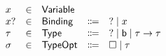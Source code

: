 \documentclass[acmsmall,dvipsnames,10pt,nonacm]{acmart}\settopmatter{printfolios=true} %
\newcommand{\TName}{{\normalfont\textsf{Type}}}
\newcommand{\TV}{\ensuremath{\tau}}
\newcommand{\THole}{\ensuremath{?}}
\newcommand{\TBase}{\ensuremath{{\normalfont\textsf{b}}}} %
\newcommand{\TNum}{\ensuremath{{\normalfont\textsf{num}}}}
\newcommand{\TArrow}[2]{\ensuremath{#1 \to #2}}
\newcommand{\DName}{{\normalfont\textsf{TypeOpt}}}
\newcommand{\DV}{\ensuremath{\sigma}}
\newcommand{\DNone}{\square}
\newcommand{\DSome}[1]{#1}
\newcommand{\MName}{{\normalfont\textsf{Mark}}}
\newcommand{\MV}{\ensuremath{m}}
\newcommand{\MGood}{\ensuremath{\scalebox{0.7}{{\color{mygreen} \checkmark}}}}
\newcommand{\MBad}{\ensuremath{{\color{myred}\times}}}
\newcommand{\BEName}{{\normalfont\textsf{BareExp}}}
\newcommand{\BEV}{\ensuremath{e}}
\newcommand{\MEUName}{{\normalfont\textsf{MarkedSynExp}}}
\newcommand{\MEUV}{\ensuremath{\check{e}^{\Syn}}}
\newcommand{\MEMName}{{\normalfont\textsf{MarkedConExp}}}
\newcommand{\MEMV}{\ensuremath{\dot{\check{e}}}}
\newcommand{\MELName}{{\normalfont\textsf{MarkedAnaExp}}}
\newcommand{\MELV}{\ensuremath{\vphantom{a}^{\Syn\hspace{-2px}}\check{e}}}
\newcommand{\MPV}{\ensuremath{\check{p}}}
\newcommand{\MPName}{{\normalfont\textsf{MarkedProgram}}}
\newcommand{\VV}{\ensuremath{x}}
\newcommand{\VName}{{\normalfont\textsf{Variable}}}
\newcommand{\BV}{\ensuremath{x?}}
\newcommand{\BName}{{\normalfont\textsf{Binding}}}
\newcommand{\BEHole}{\ensuremath{?}}
\newcommand{\BEVar}[1]{\ensuremath{#1}}
\newcommand{\BELam}[3]{\ensuremath{\lambda \lparen #1 : #2 \rparen .~#3}} %
\newcommand{\BEAp}[2]{\ensuremath{#1\lhd#2}} %
\newcommand{\BEAsc}[2]{\ensuremath{#1 : #2}}
\newcommand{\EHole}{\ensuremath{?}}
\newcommand{\EVar}[2]{\ensuremath{#1_{#2}}}
\newcommand{\ELam}[5]{\ensuremath{\lambda \lparen #1 : #2 \rparen_{#3,#4}.#5}} %
\newcommand{\EApSymbol}{\ensuremath{\lhd}} %
\newcommand{\EAp}[3]{\ensuremath{#1\EApSymbol_{#2}#3}} %
\newcommand{\EAsc}[2]{\ensuremath{#1 : #2}} %
\newcommand{\Syn}{\ensuremath{\mathsmaller{\Rightarrow}}}
\newcommand{\OverUp}[1]{\ensuremath{\stackrel{#1}{\mathsmaller{\Rightarrow}}}}
\newcommand{\OverDown}[2]{\ensuremath{\stackrel{#1}{\mathsmaller{\Rightarrow}_{#2}}}}
\newcommand{\EUp}[2]{\ensuremath{#1{\color{mymild}\OverUp{#2}}}}
\newcommand{\ELow}[3]{\ensuremath{{\color{mymild}\OverDown{#1}{#2}}#3}}
\providecommand{\DIFaddbeginFL}{} %
\providecommand{\DIFdelbeginFL}{} %
\providecommand{\DIFdelendFL}{} %
\newcommand{\DIFscaledelfig}{0.5}
\newlength{\DIFdelgraphicswidth} %
\newlength{\DIFdelgraphicsheight} %
\newcommand{\DIFaddincludegraphics}[2][]{{\color{blue}\fbox{\DIFOincludegraphics[#1]{#2}}}} %
\newcommand{\DIFdelincludegraphics}[2][]{%
\sbox{\DIFdelgraphicsbox}{\DIFOincludegraphics[#1]{#2}}%
\settoboxwidth{\DIFdelgraphicswidth}{\DIFdelgraphicsbox} %
\settoboxtotalheight{\DIFdelgraphicsheight}{\DIFdelgraphicsbox} %
\scalebox{\DIFscaledelfig}{%
\parbox[b]{\DIFdelgraphicswidth}{\usebox{\DIFdelgraphicsbox}\\[-\baselineskip] \rule{\DIFdelgraphicswidth}{0em}}\llap{\resizebox{\DIFdelgraphicswidth}{\DIFdelgraphicsheight}{%
\setlength{\unitlength}{\DIFdelgraphicswidth}%
\begin{picture}(1,1)%
\thicklines\linethickness{2pt} %
{\color[rgb]{1,0,0}\put(0,0){\framebox(1,1){}}}%
{\color[rgb]{1,0,0}\put(0,0){\line( 1,1){1}}}%
{\color[rgb]{1,0,0}\put(0,1){\line(1,-1){1}}}%
\end{picture}%
}\hspace*{3pt}}} %
} %
\DeclareRobustCommand{\DIFaddbeginFL}{\DIFOaddbeginFL \let\includegraphics\DIFaddincludegraphics} %
\DeclareRobustCommand{\DIFdelbeginFL}{\DIFOdelbeginFL \let\includegraphics\DIFdelincludegraphics} %
\DeclareRobustCommand{\DIFdelendFL}{\DIFOaddendFL \let\includegraphics\DIFOincludegraphics} %
\begin{document}

\begin{figure}
    \[\DIFdelbeginFL %
\DIFdelendFL \DIFaddbeginFL \begin{array}{lcllll}
    \VV & \in & \VName &  & \\ 
    \BV & \in & \BName & \Coloneqq & \EHole \mid \VV \\ 
    \TV & \in & \TName & \Coloneqq & 
        \THole 
        \mid \TBase
        \mid \TArrow{\TV}{\TV} \\ 
    \DV & \in & \DName & \Coloneqq & 
        \DNone
        \mid \DSome{\tau}\\ 

\end{array}\]
\end{figure}
\end{document}
